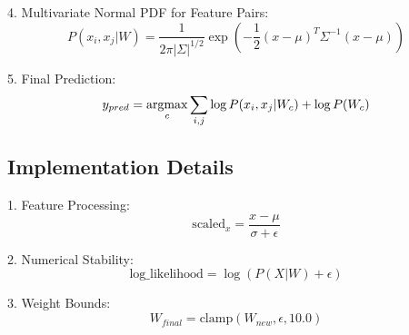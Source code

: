 \documentclass{article}
\newcommand{\argmax}{\operatornamewithlimits{argmax}}
\begin{document}
4. Multivariate Normal PDF for Feature Pairs:
\[P(x_i, x_j|W) = \frac{1}{2\pi|\Sigma|^{1/2}} \exp\left(-\frac{1}{2}(x-\mu)^T\Sigma^{-1}(x-\mu)\right)\]

5. Final Prediction:
\[y_{pred} = \argmax_c \sum_{i,j} \log P(x_i, x_j|W_c) + \log P(W_c)\]

\subsection*{Implementation Details}

1. Feature Processing:
\[\text{scaled}_x = \frac{x - \mu}{\sigma + \epsilon}\]

2. Numerical Stability:
\[\text{log\_likelihood} = \log(P(X|W) + \epsilon)\]

3. Weight Bounds:
\[W_{final} = \text{clamp}(W_{new}, \epsilon, 10.0)\]
\end{document}
